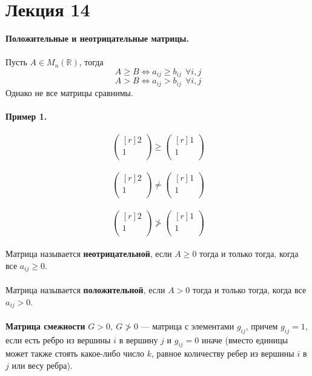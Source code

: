 \documentclass[12pt]{article}
\theoremstyle{definition}
\numberwithin{equation}{section}
\begin{document}
\section *{Лекция 14}
\noindent\textbf{Положительные и неотрицательные матрицы.}\\ \\
Пусть $A\in M_n(\mathbb{R})$, тогда
$$A\geqslant B \Leftrightarrow a_{ij}\geqslant b_{ij} ~~\forall i, j$$
$$A> B \Leftrightarrow a_{ij}> b_{ij} ~~\forall i, j$$
Однако не все матрицы сравнимы.\\
\\
\textbf{Пример 1.}\\ \\
    \[\begin{pmatrix}[r]
2\\
1\\
\end{pmatrix}\geqslant \begin{pmatrix}[r]
1\\
1\\
\end{pmatrix}\]\\
        \[\begin{pmatrix}[r]
2\\
1\\
\end{pmatrix}\neq \begin{pmatrix}[r]
1\\
1\\
\end{pmatrix}\]\\
    \[\begin{pmatrix}[r]
2\\
1\\
\end{pmatrix}\ngtr \begin{pmatrix}[r]
1\\
1\\
\end{pmatrix}\]
\\Матрица называется \textbf{неотрицательной}, если $A\geqslant 0$ тогда и только тогда, когда все $a_{ij}\geqslant 0$.\\
\\
Матрица называется \textbf{положительной}, если $A> 0$ тогда и только тогда, когда все $a_{ij}> 0$.\\
\\
\textbf{Матрица смежности} $G>0,~G\ngtr 0$ --- матрица с элементами $g_{ij}$, причем $g_{ij}=1$, если есть ребро из вершины $i$ в вершину $j$ и $g_{ij}=0$ иначе (вместо единицы может также стоять какое-либо число $k$, равное количеству ребер из вершины $i$ в $j$ или весу ребра).
\end{document}
